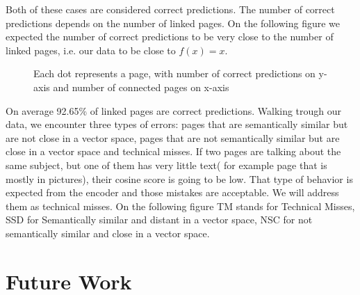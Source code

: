 \documentclass{article}
\begin{document}
Both of these cases are considered correct predictions. The number of correct predictions depends on the number of linked pages. On the following figure we expected the number of correct predictions to be very close to the number of linked pages, i.e. our data to be close to \( f(x) = x\).

\begin{figure}[H]
\centering
{}
\caption{Each dot represents a page, with number of correct predictions on y-axis and number of connected pages on x-axis}
\end{figure}

On average 92.65\% of linked pages are correct predictions. 
Walking trough our data, we encounter three types of errors: pages that are semantically similar but are not close in a vector space, pages that are not semantically similar but are close in a vector space and technical misses. If two pages are talking about the same subject, but one of them has very little text( for example page that is mostly in pictures), their cosine score is going to be low. That type of behavior is expected from the encoder and those mistakes are acceptable. We will address them as technical misses.
On the following figure TM stands for Technical Misses, SSD for Semantically similar and distant in a vector space, NSC for not semantically similar and close in a vector space. 

\section{Future Work}
\end{document}
